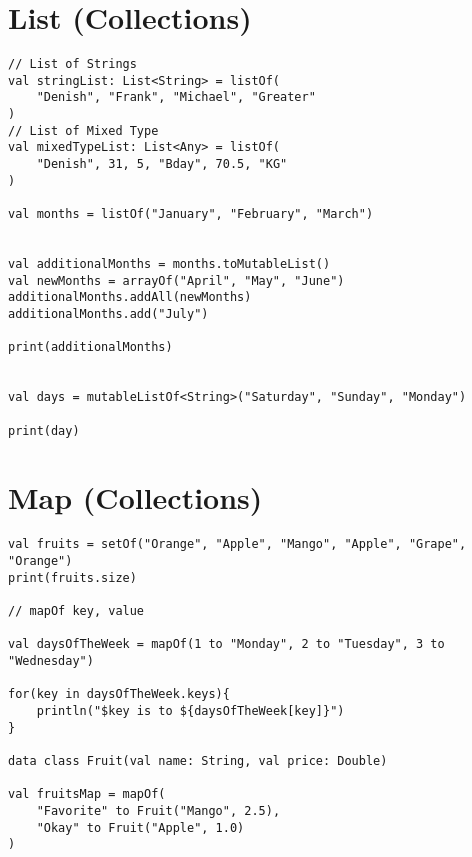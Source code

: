 \documentclass[11pt]{article}
\begin{document}
\section*{List (Collections)}
\label{sec:org738ba43}
\begin{verbatim}
// List of Strings
val stringList: List<String> = listOf(
    "Denish", "Frank", "Michael", "Greater"
)
// List of Mixed Type
val mixedTypeList: List<Any> = listOf(
    "Denish", 31, 5, "Bday", 70.5, "KG"
)

val months = listOf("January", "February", "March")


val additionalMonths = months.toMutableList()
val newMonths = arrayOf("April", "May", "June")
additionalMonths.addAll(newMonths)
additionalMonths.add("July")

print(additionalMonths)


val days = mutableListOf<String>("Saturday", "Sunday", "Monday")

print(day)
\end{verbatim}

\section*{Map (Collections)}
\label{sec:orga1e2ad1}
\begin{verbatim}
val fruits = setOf("Orange", "Apple", "Mango", "Apple", "Grape", "Orange")
print(fruits.size)

// mapOf key, value

val daysOfTheWeek = mapOf(1 to "Monday", 2 to "Tuesday", 3 to "Wednesday")

for(key in daysOfTheWeek.keys){
    println("$key is to ${daysOfTheWeek[key]}")
}

data class Fruit(val name: String, val price: Double)

val fruitsMap = mapOf(
    "Favorite" to Fruit("Mango", 2.5),
    "Okay" to Fruit("Apple", 1.0)
)
\end{verbatim}
\end{document}
